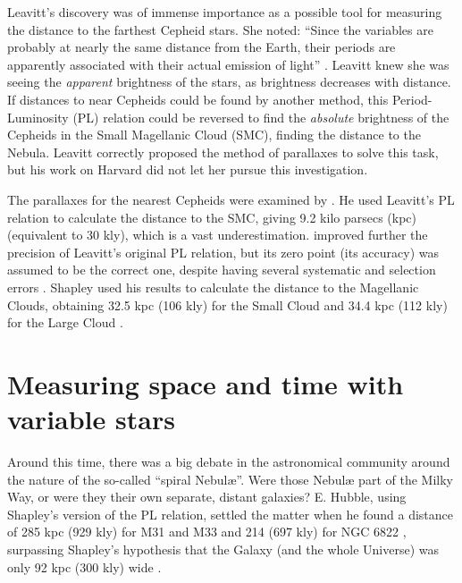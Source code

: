 Leavitt's discovery was of immense importance as a possible tool for measuring the distance to the farthest Cepheid stars. 
She noted: \enquote{Since the variables are probably at nearly the same distance from the Earth,
their periods are apparently associated with their actual emission of light} \citep[page 3]{Leavitt1912}.
Leavitt knew she was seeing the \textit{apparent} brightness of the stars, as brightness decreases with distance.
If distances to near Cepheids could be found by another method, 
this Period-Luminosity (PL) relation could be reversed to find the \textit{absolute} brightness of the Cepheids in the Small Magellanic Cloud (SMC),
finding the distance to the Nebula.
Leavitt correctly proposed the method of parallaxes to solve this task, but his work on Harvard did not let her pursue this investigation.


The parallaxes for the nearest Cepheids were examined by \cite{Hertzsprung1913}.
He used Leavitt's PL relation to calculate the distance to the SMC, 
giving \citep[after a \enquote{pen error}, see][]{Fernie1969} 9.2 kilo parsecs (kpc) (equivalent to 30 kly), which is a vast underestimation.
\cite{Shapley1918} improved further the precision of Leavitt's original PL relation, 
but its zero point (its accuracy) was assumed to be the correct one, despite having several systematic and selection errors \citep{Fernie1969}.
Shapley used his results to calculate the distance to the Magellanic Clouds, 
obtaining 32.5 kpc (106 kly) for the Small Cloud \citep{Shapley1924S} and 34.4 kpc (112 kly) for the Large Cloud \citep{Shapley1924L}.

\section{Measuring space and time with variable stars}


Around this time, there was a big debate in the astronomical community around the nature of the so-called \enquote{spiral Nebul\ae{}}.
Were those Nebul\ae{} part of the Milky Way, or were they their own separate, distant galaxies?
E. Hubble, using Shapley's version of the PL relation, settled the matter when he found a distance of 285 kpc (929 kly) for M31 and M33 
\citep[now called the Andromeda and Triangulum galaxies,][]{Hubble1925a}
and 214 (697 kly) for NGC 6822 \citep[Barnard's galaxy,][]{Hubble1925b}, 
surpassing Shapley's hypothesis that the Galaxy (and the whole Universe) was only 92 kpc (300 kly) wide \citep{ShapleyCurtis1921}.

